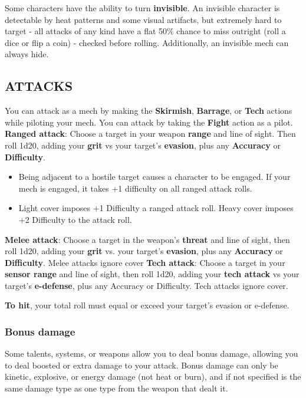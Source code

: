 Some characters have the ability to turn \textbf{invisible}. An invisible character is detectable by heat patterns and some visual artifacts, but extremely hard to target - all attacks of any kind have a flat 50\% chance to miss outright (roll a dice or flip a coin) - checked before rolling. Additionally, an invisible mech can always hide.


\subsection{ATTACKS}
You can attack as a mech by making the \textbf{Skirmish}, \textbf{Barrage}, or \textbf{Tech} actions while piloting your mech. You can attack by taking the \textbf{Fight} action as a pilot.
\textbf{Ranged attack}: Choose a target in your weapon \textbf{range} and line of sight. Then roll 1d20, adding your \textbf{grit} vs your target’s \textbf{evasion}, plus any \textbf{Accuracy} or \textbf{Difficulty}.
\begin{itemize}
     \item Being adjacent to a hostile target causes a character to be engaged. If your mech is engaged, it takes +1 difficulty on all ranged attack rolls.
     \item Light cover imposes +1 Difficulty a ranged attack roll. Heavy cover imposes +2 Difficulty to the attack roll.
\end{itemize}
\textbf{Melee attack}: Choose a target in the weapon’s \textbf{threat} and line of sight, then roll 1d20, adding your \textbf{grit} vs. your target’s \textbf{evasion}, plus any \textbf{Accuracy} or \textbf{Difficulty}.
\qquad Melee attacks ignore cover
\textbf{Tech attack}: Choose a target in your \textbf{sensor range} and line of sight, then roll 1d20, adding your \textbf{tech attack} vs your target’s \textbf{e-defense}, plus any Accuracy or Difficulty. Tech attacks ignore cover.

\textbf{To hit}, your total roll must equal or exceed your target’s evasion or e-defense.


\subsubsection{Bonus damage}
Some talents, systems, or weapons allow you to deal bonus damage, allowing you to deal boosted or extra damage to your attack. Bonus damage can only be kinetic, explosive, or energy damage (not heat or burn), and if not specified is the same damage type as one type from the weapon that dealt it.

